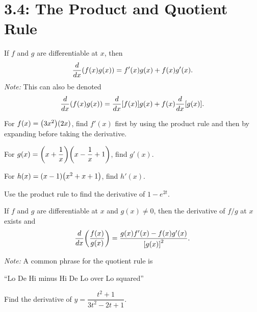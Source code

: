 \documentclass[mathNotesPreamble]{subfiles}
\begin{document}
\section{3.4: The Product and Quotient Rule}
\begin{thmBox*}
  If $f$ and $g$ are differentiable at $x$, then 
    $$\dfrac{d}{dx}{\left(f(x)g(x)\right)}=f'(x)g(x)+f(x)g'(x).$$
  \textit{Note:} This can also be denoted 
    $$\dfrac{d}{dx}{\left(f(x)g(x)\right)}=\dfrac{d}{dx}{\left[f(x)\right]}g(x)+f(x)\dfrac{d}{dx}{\left[g(x)\right]}.$$
\end{thmBox*}
  
\begin{ex*}
  For $f(x)={\left(3x^2\right)}{\left(2x\right)}$, find $f'(x)$ first by using the product rule and then by expanding before taking the derivative.
\end{ex*}
\begin{ex*}
  For $g(x)={\left(x+\dfrac{1}{x}\right)}{\left(x-\dfrac{1}{x}+1\right)}$, find $g'(x)$.
\end{ex*}
\begin{ex*}
  For $h(x)={\left(x-1\right)}{\left(x^2+x+1\right)}$, find $h'(x)$.
\end{ex*}
\pagebreak

\begin{ex*}
  Use the product rule to find the derivative of $1-e^{2t}$.
\end{ex*}

\begin{thmBox*}
  If $f$ and $g$ are differentiable at $x$ and $g(x)\neq 0$, then the derivative of $f/g$ at $x$ exists and 
    $$\dfrac{d}{dx}{\left(\dfrac{f(x)}{g(x)}\right)}=\dfrac{g(x)f'(x)-f(x)g'(x)}{{\left[g(x)\right]}^2}.$$
  
  \textit{Note:} A common phrase for the quotient rule is
  
  {\centering ``Lo De Hi minus Hi De Lo over Lo squared'' \par}
\end{thmBox*}

\begin{ex*}
  Find the derivative of $y=\dfrac{t^2+1}{3t^2-2t+1}$.
\end{ex*}
\pagebreak
\end{document}
